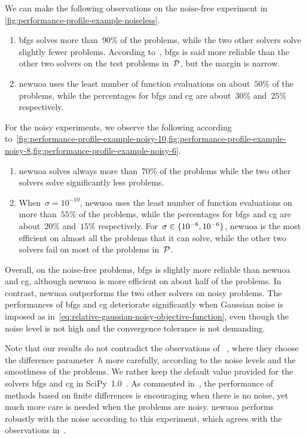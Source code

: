 We can make the following observations on the noise-free experiment in \cref{fig:performance-profile-example-noiseless}.
\begin{enumerate}
    \item \Gls{bfgs} solves more than~$90\%$ of the problems, while the two other solvers solve slightly fewer problems.
    According to~\cite[\S~2]{More_Wild_2009}, \gls{bfgs} is said more reliable than the other two solvers on the test problems in~$\mathcal{P}$, but the margin is narrow.
    \item \Gls{newuoa} uses the least number of function evaluations on about~$50\%$ of the problems, while the percentages for \gls{bfgs} and \gls{cg} are about~$30\%$ and~$25\%$ respectively.
\end{enumerate}

For the noisy experiments, we observe the following according to~\cref{fig:performance-profile-example-noisy-10,fig:performance-profile-example-noisy-8,fig:performance-profile-example-noisy-6}.
\begin{enumerate}
    \item \Gls{newuoa} solves always more than~$70\%$ of the problems while the two other solvers solve significantly less problems.
    \item When~$\sigma = 10^{-10}$, \gls{newuoa} uses the least number of function evaluations on more than~$55\%$ of the problems, while the percentages for \gls{bfgs} and \gls{cg} are about~$20\%$ and~$15\%$ respectively.
    For~$\sigma \in \{10^{-8}, 10^{-6}\}$, \gls{newuoa} is the most efficient on almost all the problems that it can solve, while the other two solvers fail on most of the problems in~$\mathcal{P}$.
\end{enumerate}

Overall, on the noise-free problems, \gls{bfgs} is slightly more reliable than \gls{newuoa} and \gls{cg}, although \gls{newuoa} is more efficient on about half of the problems.
In contrast, \gls{newuoa} outperforms the two other solvers on noisy problems.
The performances of \gls{bfgs} and \gls{cg} deteriorate significantly when Gaussian noise is imposed as in~\cref{eq:relative-gaussian-noisy-objective-function}, even though the noise level is not high and the convergence tolerance is not demanding.

Note that our results do not contradict the observations of \citeauthor{Shi_Etal_2021}~\cite{Shi_Etal_2021}, where they choose the difference parameter~$h$ more carefully, according to the noise levels and the smoothness of the problems.
We rather keep the default value provided for the solvers \gls{bfgs} and \gls{cg} in SciPy~1.0~\cite{Virtanen_Etal_2020}.
As commented in~\cite{Shi_Etal_2021}, the performance of methods based on finite differences is encouraging when there is no noise, yet much more care is needed when the problems are noisy.
\Gls{newuoa} performs robustly with the noise according to this experiment, which agrees with the observations in~\cite{Shi_Etal_2021}.

